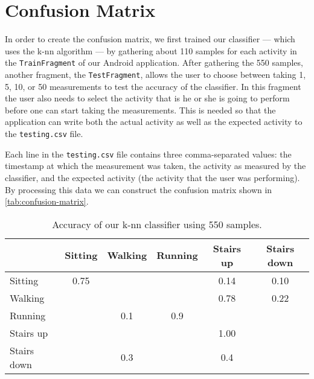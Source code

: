 \section{Confusion Matrix}
\label{sec:confusion-matrix}
In order to create the confusion matrix, we first trained our classifier --- which uses the k-nn algorithm --- by gathering about 110 samples for each activity in the \texttt{TrainFragment} of our Android application. After gathering the 550 samples, another fragment, the \texttt{TestFragment}, allows the user to choose between taking 1, 5, 10, or 50 measurements to test the accuracy of the classifier. In this fragment the user also needs to select the activity that is he or she is going to perform before one can start taking the measurements. This is needed so that the application can write both the actual activity as well as the expected activity to the \texttt{testing.csv} file.

Each line in the \texttt{testing.csv} file contains three comma-separated values: the timestamp at which the measurement was taken, the activity as measured by the classifier, and the expected activity (the activity that the user was performing). By processing this data we can construct the confusion matrix shown in \autoref{tab:confusion-matrix}.

\begin{table}[ht]
\centering
\caption{Accuracy of our k-nn classifier using 550 samples.}
\begin{tabular}{lccccc}
\toprule
 & Sitting & Walking & Running & Stairs up & Stairs down\\
\midrule
Sitting & 0.75 &  &  &  0.14 & 0.10\\
Walking &  &  &  & 0.78 & 0.22\\
Running &  & 0.1 & 0.9 &  & \\
Stairs up &  &  &  & 1.00 & \\
Stairs down &  & 0.3 &  & 0.4 & \\
\bottomrule
\end{tabular}
\label{tab:confusion-matrix}
\end{table}
